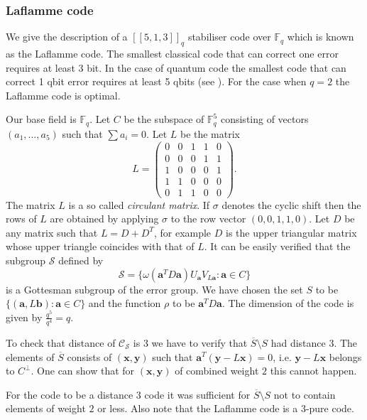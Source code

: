 \documentclass[11pt,twoside]{article}
\theoremstyle{definition}
\theoremstyle{remark}
\newcommand{\GF}[0]{\ensuremath{\mathbb{F}}}
\begin{document}
\subsubsection*{Laflamme code}

We give the description of a $[[5,1,3]]_q$ stabiliser code over
$\GF_q$ which is known as the Laflamme code.  The smallest classical
code that can correct one error requires at least 3 bit. In the case of
quantum code the smallest code that can correct 1 qbit error requires
at least 5 qbits (see \cite{calderbank98quantum}). For the case when $q
= 2$ the Laflamme code is optimal.

Our base field is $\GF_q$. Let $C$ be the subspace of $\GF_q^5$
consisting of vectors $(a_1,\ldots,a_5)$ such that $\sum a_i = 0$. Let
$L$ be the matrix
\[
L = \left(\begin{array}{ccccc}
    0 & 0 & 1 & 1 & 0\\
    0 & 0 & 0 & 1 & 1\\
    1 & 0 & 0 & 0 & 1\\
    1 & 1 & 0 & 0 & 0\\
    0 & 1 & 1 & 0 & 0
    \end{array}
    \right).
\]
The matrix $L$ is a so called \emph{circulant matrix}. If $\sigma$
denotes the cyclic shift then the rows of $L$ are obtained by applying
$\sigma$ to the row vector $(0 ,0, 1, 1, 0)$. Let $D$ be any matrix
such that $L = D + D^T$, for example $D$ is the upper triangular matrix
whose upper triangle coincides with that of $L$. It can be easily
verified that the subgroup $\mathcal{S}$ defined by
\[
\mathcal{S} = \{ \omega(\mathbf{a}^T D \mathbf{a}) U_\mathbf{a}
V_{L\mathbf{a}} : \mathbf{a} \in C \}
\]
is a Gottesman subgroup of the error group. We have chosen the set $S$
to be $\{ (\mathbf{a},L\mathbf{b}) : \mathbf{a} \in C \}$ and the
function $\rho$ to be $\mathbf{a}^T D \mathbf{a}$.  The dimension of
the code is given by $\frac{q^5}{q^4} = q$.

To check that distance of $\mathcal{C}_\mathcal{S}$ is $3$ we have to
verify that $\overline{S} \setminus S$ had distance $3$. The elements
of $\overline{S}$ consists of $(\mathbf{x},\mathbf{y})$ such that
$\mathbf{a}^T(\mathbf{y} - L\mathbf{x}) = 0$, i.e. $\mathbf{y} -
L\mathbf{x}$ belongs to $C^\perp$. One can show that for
$(\mathbf{x},\mathbf{y})$ of combined weight $2$ this cannot happen.

For the code to be a distance $3$ code it was sufficient for
$\overline{S} \setminus S$ not to contain elements of weight $2$ or
less. Also note that the Laflamme code is a $3$-pure code.
\end{document}
